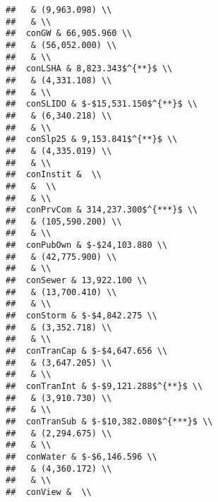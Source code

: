 \documentclass[]{article}
\begin{document}
\begin{verbatim}
##   & (9,963.098) \\ 
##   & \\ 
##  conGW & 66,905.960 \\ 
##   & (56,052.000) \\ 
##   & \\ 
##  conLSHA & 8,823.343$^{**}$ \\ 
##   & (4,331.108) \\ 
##   & \\ 
##  conSLIDO & $-$15,531.150$^{**}$ \\ 
##   & (6,340.218) \\ 
##   & \\ 
##  conSlp25 & 9,153.841$^{**}$ \\ 
##   & (4,335.019) \\ 
##   & \\ 
##  conInstit &  \\ 
##   &  \\ 
##   & \\ 
##  conPrvCom & 314,237.300$^{***}$ \\ 
##   & (105,590.200) \\ 
##   & \\ 
##  conPubOwn & $-$24,103.880 \\ 
##   & (42,775.900) \\ 
##   & \\ 
##  conSewer & 13,922.100 \\ 
##   & (13,700.410) \\ 
##   & \\ 
##  conStorm & $-$4,842.275 \\ 
##   & (3,352.718) \\ 
##   & \\ 
##  conTranCap & $-$4,647.656 \\ 
##   & (3,647.205) \\ 
##   & \\ 
##  conTranInt & $-$9,121.288$^{**}$ \\ 
##   & (3,910.730) \\ 
##   & \\ 
##  conTranSub & $-$10,382.080$^{***}$ \\ 
##   & (2,294.675) \\ 
##   & \\ 
##  conWater & $-$6,146.596 \\ 
##   & (4,360.172) \\ 
##   & \\ 
##  conView &  \\ 

\end{verbatim}
\end{document}
